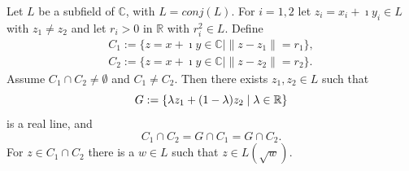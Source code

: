 \begin{lemma} 
    \label{lem:ConjClosed.Intersection_circle_circle}
    \leanok
    Let $L$ be a subfield of $\mathbb{C}$, with $L = conj(L)$. For $i = 1,2 $ let $z_i = x_i + \imath y_i \in L$ with $z_1 \ne z_2$ and let $r_i > 0$ in $\mathbb{R}$ with $r_i^2 \in L$. Define
    \begin{equation*} \begin{aligned}
        C_1 := \{z = x + \imath y \in \mathbb{C} \mid \|z - z_1\| = r_1\},\\
        C_2 := \{z = x + \imath y \in \mathbb{C} \mid \|z - z_2\| = r_2\}.
    \end{aligned} \end{equation*}
    Assume $C_1 \cap C_2 \ne \emptyset$ and $C_1 \ne C_2$. Then  there  exists $z_1, z_2 \in L$ such that
     $$G := \{ \lambda z_1 + (1-\lambda) z_2 \mid \lambda \in \mathbb{R} \}$$ %
    is a real line, and $$ C_1 \cap C_2 = G \cap C_1 = G \cap C_2. $$
    For $z \in C_1 \cap C_2$ there is a $w \in L$ such that $z \in L(\sqrt{w})$.
\end{lemma}
